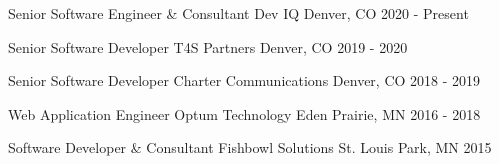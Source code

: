 

\begin{cventriesshort}

  \cventryshort
    {Senior Software Engineer \& Consultant} %
    {Dev IQ} %
    {Denver, CO} %
    {2020 - Present} %
    {
    }

  \cventryshort
  {Senior Software Developer} %
  {T4S Partners} %
  {Denver, CO} %
  {2019 - 2020} %
  {
  }

  \cventryshort
  {Senior Software Developer} %
  {Charter Communications} %
  {Denver, CO} %
  {2018 - 2019} %
  {
  }

  \cventryshort
  {Web Application Engineer} %
  {Optum Technology} %
  {Eden Prairie, MN} %
  {2016 - 2018} %
  {
  }

  \cventryshort
  {Software Developer \& Consultant} %
  {Fishbowl Solutions} %
  {St. Louis Park, MN} %
  {2015} %
  {
  }
\end{cventriesshort}
